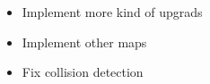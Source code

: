 
\begin{itemize}
\item Implement more kind of upgrads
\item Implement other maps
\item Fix collision detection
\end{itemize}
